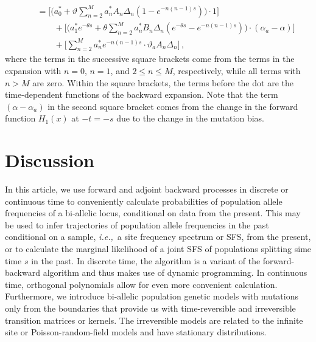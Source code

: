 \documentclass[preprint]{elsarticle}
\newcommand\ie{{\it i.e.,}}
\begin{document}
{\begin{equation}
\begin{split}
    &\quad=\bigg[\bigg(a_0^{*}+\vartheta\sum_{n=2}^M a_n^{*}A_n\Delta_n  (1-e^{-n(n-1)s})\bigg)\cdot 1\bigg]\\ &\quad\qquad+\bigg[\bigg(a_1^{*} e^{-\theta s}+\theta\sum_{n=2}^M a_n^{*}B_n\Delta_n(e^{-\theta s}- e^{-n(n-1)s})\bigg)\cdot (\alpha_a-\alpha)\bigg]\\
    &\quad\qquad+\bigg[\sum_{n=2}^M a_n^{*} e^{-n(n-1)s}\cdot \vartheta_a A_n\Delta_n\bigg]\,,
\end{split}
\end{equation}
where the terms in the successive square brackets come from the terms in the expansion with $n=0$, $n=1$, and $2\leq n\leq M$, respectively, while all terms with $n>M$ are zero. Within the square brackets, the terms before the dot are the time-dependent functions of the backward expansion. Note that the term $(\alpha-\alpha_a)$ in the second square bracket comes from the change in the forward function $H_1(x)$ at $-t=-s$  due to the change in the mutation bias. 

\section{Discussion}

In this article, we use forward and adjoint backward processes in discrete or continuous time to conveniently calculate probabilities of population allele frequencies of a bi-allelic locus, conditional on data from the present. This may be used to infer trajectories of population allele frequencies in the past conditional on a sample, \ie\ a site frequency spectrum or SFS, from the present, or to calculate the marginal likelihood of a joint SFS of populations splitting sime time $s$ in the past. In discrete time, the algorithm is a variant of the forward-backward algorithm and thus makes use of dynamic programming. In continuous time, orthogonal polynomials allow for even more convenient calculation. Furthermore, we introduce bi-allelic population genetic models with mutations only from the boundaries that provide us with time-reversible and irreversible transition matrices or kernels. The irreversible models are related to the infinite site \citep{Kimu69,Evan07} or Poisson-random-field models \citep{Sawy92} and have stationary distributions.

}
\end{document}
